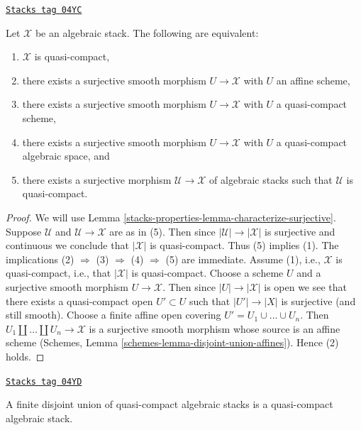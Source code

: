 \begin{lemma}
\label{stacks-properties-lemma-quasi-compact-stack}
\href{https://stacks.math.columbia.edu/tag/04YC}{\texttt{Stacks tag 04YC}}

Let $\mathcal{X}$ be an algebraic stack.
The following are equivalent:
\begin{enumerate}
\item $\mathcal{X}$ is quasi-compact,
\item there exists a surjective smooth morphism $U \to \mathcal{X}$
with $U$ an affine scheme,
\item there exists a surjective smooth morphism $U \to \mathcal{X}$
with $U$ a quasi-compact scheme,
\item there exists a surjective smooth morphism $U \to \mathcal{X}$
with $U$ a quasi-compact algebraic space, and
\item there exists a surjective morphism $\mathcal{U} \to \mathcal{X}$
of algebraic stacks such that $\mathcal{U}$ is quasi-compact.
\end{enumerate}
\end{lemma}

\begin{proof}
We will use
Lemma \ref{stacks-properties-lemma-characterize-surjective}.
Suppose $\mathcal{U}$ and $\mathcal{U} \to \mathcal{X}$ are as in (5).
Then since $|\mathcal{U}| \to |\mathcal{X}|$ is surjective and
continuous we conclude that $|\mathcal{X}|$ is quasi-compact.
Thus (5) implies (1). The implications
(2) $\Rightarrow$ (3) $\Rightarrow$ (4) $\Rightarrow$ (5)
are immediate. Assume (1), i.e., $\mathcal{X}$ is quasi-compact, i.e., that
$|\mathcal{X}|$ is quasi-compact. Choose a scheme $U$ and a surjective
smooth morphism $U \to \mathcal{X}$. Then since $|U| \to |\mathcal{X}|$
is open we see that there exists a quasi-compact open $U' \subset U$
such that $|U'| \to |X|$ is surjective (and still smooth).
Choose a finite affine open covering $U' = U_1 \cup \ldots \cup U_n$.
Then $U_1 \amalg \ldots \amalg U_n \to \mathcal{X}$
is a surjective smooth morphism whose source is an
affine scheme (Schemes, Lemma \ref{schemes-lemma-disjoint-union-affines}).
Hence (2) holds.
\end{proof}

\begin{lemma}
\label{stacks-properties-lemma-finite-disjoint-quasi-compact}
\href{https://stacks.math.columbia.edu/tag/04YD}{\texttt{Stacks tag 04YD}}

A finite disjoint union of quasi-compact algebraic stacks is
a quasi-compact algebraic stack.
\end{lemma}

